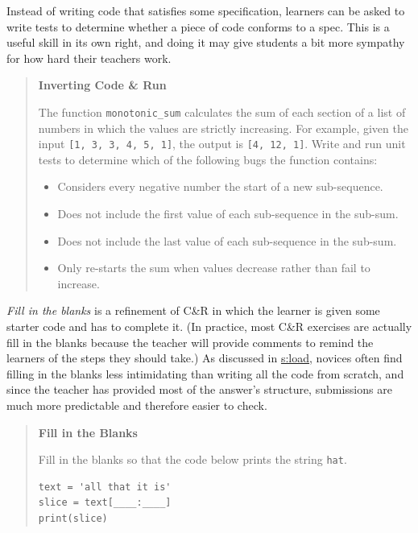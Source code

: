Instead of writing code that satisfies some specification, learners can
be asked to write tests to determine whether a piece of code conforms to
a spec. This is a useful skill in its own right, and doing it may give
students a bit more sympathy for how hard their teachers work.

\begin{quote}\setlength{\parindent}{0pt}
\textbf{Inverting Code \& Run}

The function \texttt{monotonic\_sum} calculates the sum of each section of a
list of numbers in which the values are strictly increasing. For
example, given the input \texttt{{[}1,\ 3,\ 3,\ 4,\ 5,\ 1{]}}, the output is
\texttt{{[}4,\ 12,\ 1{]}}. Write and run unit tests to determine which of the
following bugs the function contains:

\begin{itemize}
\item
  Considers every negative number the start of a new sub-sequence.
\item
  Does not include the first value of each sub-sequence in the
  sub-sum.
\item
  Does not include the last value of each sub-sequence in the
  sub-sum.
\item
  Only re-starts the sum when values decrease rather than fail to
  increase.
\end{itemize}
\end{quote}

\emph{Fill in the blanks} is a refinement of C\&R in which the learner is
given some starter code and has to complete it. (In practice, most C\&R
exercises are actually fill in the blanks because the teacher will
provide comments to remind the learners of the steps they should take.)
As discussed in \protect\hyperlink{CHAPTER}{s:load}, novices often find filling in the
blanks less intimidating than writing all the code from scratch, and
since the teacher has provided most of the answer's structure,
submissions are much more predictable and therefore easier to check.

\begin{quote}\setlength{\parindent}{0pt}
\textbf{Fill in the Blanks}

Fill in the blanks so that the code below prints the string \texttt{\textquotesingle{}hat\textquotesingle{}}.

\begin{lstlisting}
text = 'all that it is'
slice = text[____:____]
print(slice)
\end{lstlisting}
\end{quote}

